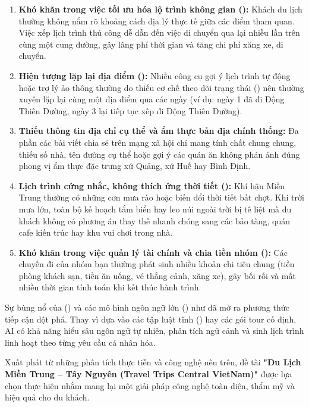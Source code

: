\begin{enumerate}
    \item \textbf{Khó khăn trong việc tối ưu hóa lộ trình không gian ():} Khách du lịch thường không nắm rõ khoảng cách địa lý thực tế giữa các điểm tham quan. Việc xếp lịch trình thủ công dễ dẫn đến việc di chuyển qua lại nhiều lần trên cùng một cung đường, gây lãng phí thời gian và tăng chi phí xăng xe, di chuyển.
    \item \textbf{Hiện tượng lặp lại địa điểm ():} Nhiều công cụ gợi ý lịch trình tự động hoặc trợ lý ảo thông thường do thiếu cơ chế theo dõi trạng thái () nên thường xuyên lặp lại cùng một địa điểm qua các ngày (ví dụ: ngày 1 đã đi Động Thiên Đường, ngày 3 lại tiếp tục xếp đi Động Thiên Đường).
    \item \textbf{Thiếu thông tin địa chỉ cụ thể và ẩm thực bản địa chính thống:} Đa phần các bài viết chia sẻ trên mạng xã hội chỉ mang tính chất chung chung, thiếu số nhà, tên đường cụ thể hoặc gợi ý các quán ăn không phản ánh đúng phong vị ẩm thực đặc trưng xứ Quảng, xứ Huế hay Bình Định.
    \item \textbf{Lịch trình cứng nhắc, không thích ứng thời tiết ():} Khí hậu Miền Trung thường có những cơn mưa rào hoặc biến đổi thời tiết bất chợt. Khi trời mưa lớn, toàn bộ kế hoạch tắm biển hay leo núi ngoài trời bị tê liệt mà du khách không có phương án thay thế nhanh chóng sang các bảo tàng, quán cafe kiến trúc hay khu vui chơi trong nhà.
    \item \textbf{Khó khăn trong việc quản lý tài chính và chia tiền nhóm ():} Các chuyến đi của nhóm bạn thường phát sinh nhiều khoản chi tiêu chung (tiền phòng khách sạn, tiền ăn uống, vé thắng cảnh, xăng xe), gây bối rối và mất nhiều thời gian tính toán khi kết thúc hành trình.
\end{enumerate}

Sự bùng nổ của  () và các mô hình ngôn ngữ lớn () như  đã mở ra phương thức tiếp cận đột phá. Thay vì dựa vào các tập luật tĩnh () hay các gói tour cố định, AI có khả năng hiểu sâu ngôn ngữ tự nhiên, phân tích ngữ cảnh và sinh lịch trình linh hoạt theo từng yêu cầu cá nhân hóa.

Xuất phát từ những phân tích thực tiễn và công nghệ nêu trên, đề tài \textbf{"Du Lịch Miền Trung -- Tây Nguyên (Travel Trips Central VietNam)"} được lựa chọn thực hiện nhằm mang lại một giải pháp công nghệ toàn diện, thẩm mỹ và hiệu quả cho du khách.


